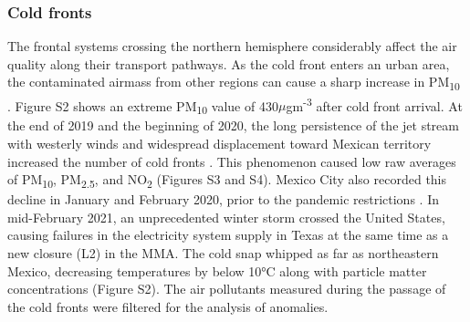 \documentclass[sn-mathphys-num,iicol]{sn-jnl}
\begin{document}
\subsubsection{Cold fronts}
The frontal systems crossing the northern hemisphere considerably affect the air quality along their transport pathways. As the cold front enters an urban area, the contaminated airmass from other regions can cause a sharp increase in PM\textsubscript{10} \citep{Kang_2019}. Figure S2 shows an extreme PM\textsubscript{10} value of 430$\mu$gm\textsuperscript{-3} after cold front arrival. At the end of 2019 and the beginning of 2020, the long persistence of the jet stream with westerly winds and widespread displacement toward Mexican territory increased the number of cold fronts \citep{yucatn}. This phenomenon caused low raw averages of PM\textsubscript{10}, PM\textsubscript{2.5}, and NO\textsubscript{2} (Figures S3 and S4). Mexico City also recorded this decline in January and February 2020, prior to the pandemic restrictions \citep{Vega_2021}. In mid-February 2021, an unprecedented winter storm crossed the United States, causing failures in the electricity system supply in Texas \citep{Doss_Gollin_2021,years} at the same time as a new closure (L2) in the MMA. The cold snap whipped as far as northeastern Mexico, decreasing temperatures by below 10°C along with particle matter concentrations (Figure S2). The air pollutants measured during the passage of the cold fronts were filtered for the analysis of anomalies.
\end{document}
